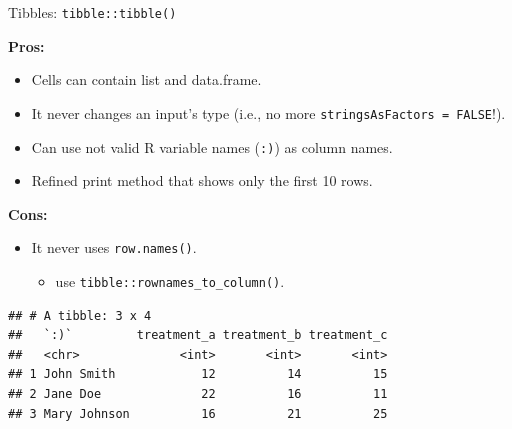\documentclass[14pt,ignorenonframetext,]{bredelebeamer}
\newenvironment{Shaded}{\begin{snugshade}}{\end{snugshade}}
\newcommand{\KeywordTok}[1]{\textcolor[rgb]{0.94,0.87,0.69}{#1}}
\newcommand{\DataTypeTok}[1]{\textcolor[rgb]{0.87,0.87,0.75}{#1}}
\newcommand{\StringTok}[1]{\textcolor[rgb]{0.80,0.58,0.58}{#1}}
\newcommand{\OperatorTok}[1]{\textcolor[rgb]{0.94,0.94,0.82}{#1}}
\newcommand{\NormalTok}[1]{\textcolor[rgb]{0.80,0.80,0.80}{#1}}
\providecommand{\tightlist}{%
  \setlength{\itemsep}{0pt}\setlength{\parskip}{0pt}}
\begin{document}
\begin{frame}[fragile]{Tibbles: \texttt{tibble::tibble()}}

\textbf{Pros: }

\begin{itemize}
\tightlist
\item
  Cells can contain list and data.frame.
\item
  It never changes an input's type (i.e., no more
  \texttt{stringsAsFactors\ =\ FALSE}!).
\item
  Can use not valid R variable names (\texttt{:)}) as column names.
\item
  Refined print method that shows only the first 10 rows.
\end{itemize}

\textbf{Cons: }

\begin{itemize}
\tightlist
\item
  It never uses \texttt{row.names()}.

  \begin{itemize}
  \tightlist
  \item
    use \texttt{tibble::rownames\_to\_column()}.
  \end{itemize}
\end{itemize}

\begin{Shaded}
\end{Shaded}

\begin{verbatim}
## # A tibble: 3 x 4
##   `:)`         treatment_a treatment_b treatment_c
##   <chr>              <int>       <int>       <int>
## 1 John Smith            12          14          15
## 2 Jane Doe              22          16          11
## 3 Mary Johnson          16          21          25
\end{verbatim}

\end{frame}
\end{document}
